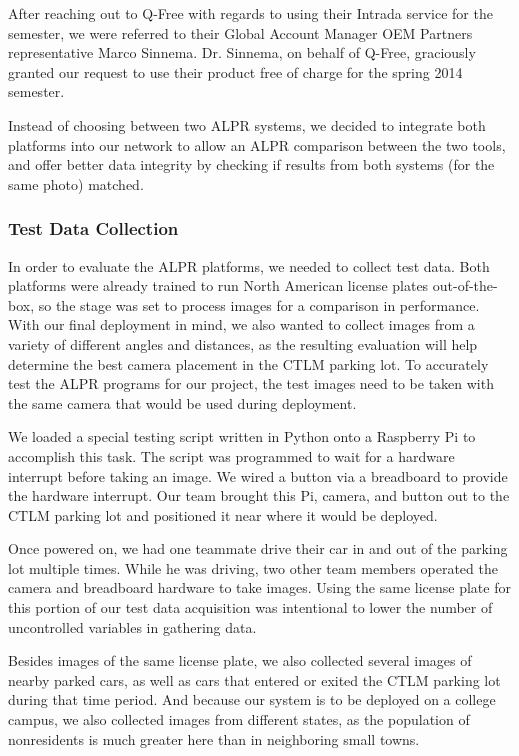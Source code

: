 \documentclass[11pt, oneside, fullpage, doublespace]{article}
\begin{document}
After reaching out to Q-Free with regards to using their Intrada service for the semester, we were referred to their Global Account Manager OEM Partners representative Marco Sinnema. Dr. Sinnema, on behalf of Q-Free, graciously granted our request to use their product free of charge for the spring 2014 semester.

Instead of choosing between two ALPR systems, we decided to integrate both platforms into our network to allow an ALPR comparison between the two tools, and offer better data integrity by checking if results from both systems (for the same photo) matched.

\subsubsection{Test Data Collection}
In order to evaluate the ALPR platforms, we needed to collect test data. Both platforms were already trained to run North American license plates out-of-the-box, so the stage was set to process images for a comparison in performance. With our final deployment in mind, we also wanted to collect images from a variety of different angles and distances, as the resulting evaluation will help determine the best camera placement in the CTLM parking lot. To accurately test the ALPR programs for our project, the test images need to be taken with the same camera that would be used during deployment.

We loaded a special testing script written in Python onto a Raspberry Pi to accomplish this task. The script was programmed to wait for a hardware interrupt before taking an image. We wired a button via a breadboard to provide the hardware interrupt. Our team brought this Pi, camera, and button out to the CTLM parking lot and positioned it near where it would be deployed.

Once powered on, we had one teammate drive their car in and out of the parking lot multiple times. While he was driving, two other team members operated the camera and breadboard hardware to take images. Using the same license plate for this portion of our test data acquisition was intentional to lower the number of uncontrolled variables in gathering data.

Besides images of the same license plate, we also collected several images of nearby parked cars, as well as cars that entered or exited the CTLM parking lot during that time period. And because our system is to be deployed on a college campus, we also collected images from different states, as the population of nonresidents is much greater here than in neighboring small towns.
\end{document}
